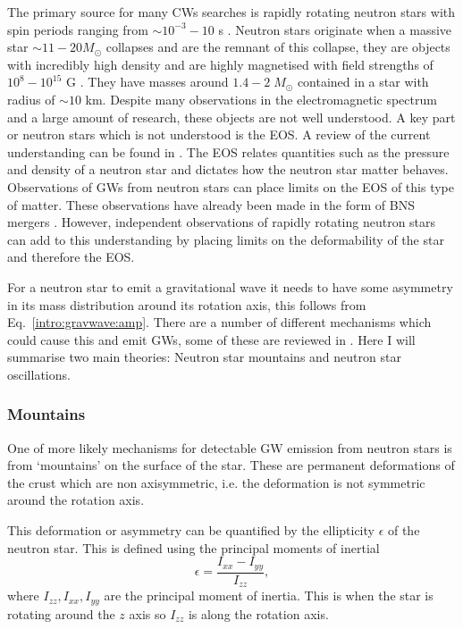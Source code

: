 The primary source for many \glspl{CW} searches is rapidly rotating neutron stars with spin periods ranging from $\sim 10^{-3} - 10$ s \citep{manchester2005AustraliaTelescope}.
Neutron stars originate when a massive star $\sim 11 - 20 M_{\odot}$ collapses and are the remnant of this collapse, they are objects with incredibly high density and are highly magnetised with field strengths of $10^8 - 10^{15}$ G \citep{konar2017MagneticFields}.
They have masses around $1.4-2 \; M_{\odot}$ contained in a star with radius of $\sim 10$ km.
Despite many observations in the electromagnetic spectrum and a large amount of research, these objects are not well understood.
A key part or neutron stars which is not understood is the \gls{EOS}. A review of the current understanding can be found in \cite{lattimer2016EquationState}.
The \gls{EOS} relates quantities such as the pressure and density of a neutron star and dictates how the neutron star matter behaves.
Observations of \glspl{GW} from neutron stars can place limits on the \gls{EOS} of this type of matter. 
These observations have already been made in the form of \gls{BNS} mergers \citep{abbott2017GW170817Observation}.
However, independent observations of rapidly rotating neutron stars can add to this understanding by placing limits on the deformability of the star and therefore the \gls{EOS}.

For a neutron star to emit a gravitational wave it needs to have some asymmetry in its mass distribution around its rotation axis, this follows from Eq.~\ref{intro:gravwave:amp}. 
There are a number of different mechanisms which could cause this and emit \glspl{GW}, some of these are reviewed in \citep{glampedakis2017GravitationalWaves,riles2017RecentSearches,haskell2015DetectingGravitational,lasky2015GravitationalWaves}.
Here I will summarise two main theories: Neutron star mountains and neutron star oscillations.


\subsubsection{\label{intro:source:cw:mountain}Mountains}

One of more likely mechanisms for detectable \gls{GW} emission from neutron stars is from `mountains' on the surface of the star.
These are permanent deformations of the crust which are non axisymmetric, i.e. the deformation is not symmetric around the rotation axis.

This deformation or asymmetry can be quantified by the ellipticity $\epsilon$ of the neutron star.
This is defined using the principal moments of inertial
\begin{equation}
\label{ellipticity}
\epsilon = \frac{I_{xx}-I_{yy}}{I_{zz}},
\end{equation}
where $I_{zz},I_{xx},I_{yy}$ are the principal moment of inertia.
This is when the star is rotating around the $z$ axis so $I_{zz}$ is along the rotation axis. 

